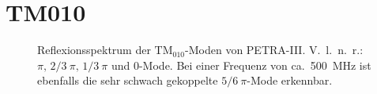 \section{TM010}
\label{app:tm010_moden}
\FloatBarrier

\begin{figure}[htbp]
	\centering
	
	\caption[Reflexionsspektrum der $\mathrm{TM}_{010}$-Moden von PETRA-III]{Reflexionsspektrum der $\mathrm{TM}_{010}$-Moden von PETRA-III. V.\ l.\ n.\ r.: $\pi,\, 2/3~\pi, \, 1/3~\pi$ und $0$-Mode. Bei einer Frequenz von ca.\ \SI{500}{MHz} ist ebenfalls die sehr schwach gekoppelte $5/6~\pi$-Mode erkennbar.}
	\label{fig:spektrum_tm010}
\end{figure}

